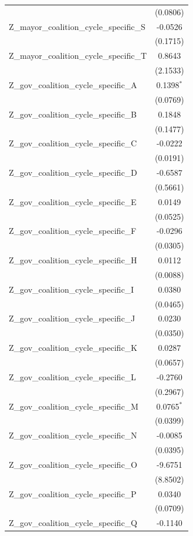 \begin{tabular}{lc}
 & (0.0806) \\
Z\_mayor\_coalition\_cycle\_specific\_S & -0.0526 \\
 & (0.1715) \\
Z\_mayor\_coalition\_cycle\_specific\_T & 0.8643 \\
 & (2.1533) \\
Z\_gov\_coalition\_cycle\_specific\_A & 0.1398$^{*}$ \\
 & (0.0769) \\
Z\_gov\_coalition\_cycle\_specific\_B & 0.1848 \\
 & (0.1477) \\
Z\_gov\_coalition\_cycle\_specific\_C & -0.0222 \\
 & (0.0191) \\
Z\_gov\_coalition\_cycle\_specific\_D & -0.6587 \\
 & (0.5661) \\
Z\_gov\_coalition\_cycle\_specific\_E & 0.0149 \\
 & (0.0525) \\
Z\_gov\_coalition\_cycle\_specific\_F & -0.0296 \\
 & (0.0305) \\
Z\_gov\_coalition\_cycle\_specific\_H & 0.0112 \\
 & (0.0088) \\
Z\_gov\_coalition\_cycle\_specific\_I & 0.0380 \\
 & (0.0465) \\
Z\_gov\_coalition\_cycle\_specific\_J & 0.0230 \\
 & (0.0350) \\
Z\_gov\_coalition\_cycle\_specific\_K & 0.0287 \\
 & (0.0657) \\
Z\_gov\_coalition\_cycle\_specific\_L & -0.2760 \\
 & (0.2967) \\
Z\_gov\_coalition\_cycle\_specific\_M & 0.0765$^{*}$ \\
 & (0.0399) \\
Z\_gov\_coalition\_cycle\_specific\_N & -0.0085 \\
 & (0.0395) \\
Z\_gov\_coalition\_cycle\_specific\_O & -9.6751 \\
 & (8.8502) \\
Z\_gov\_coalition\_cycle\_specific\_P & 0.0340 \\
 & (0.0709) \\
Z\_gov\_coalition\_cycle\_specific\_Q & -0.1140 \\

\end{tabular}
